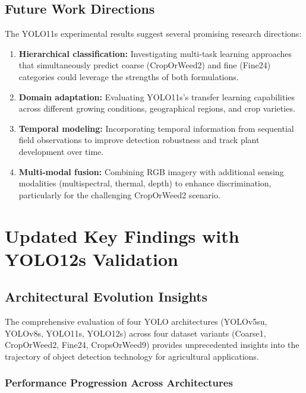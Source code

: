 \subsection{Future Work Directions}

The YOLO11s experimental results suggest several promising research directions:

\begin{enumerate}
    \item \textbf{Hierarchical classification:} Investigating multi-task learning approaches that simultaneously predict coarse (CropOrWeed2) and fine (Fine24) categories could leverage the strengths of both formulations.
    
    \item \textbf{Domain adaptation:} Evaluating YOLO11s's transfer learning capabilities across different growing conditions, geographical regions, and crop varieties.
    
    \item \textbf{Temporal modeling:} Incorporating temporal information from sequential field observations to improve detection robustness and track plant development over time.
    
    \item \textbf{Multi-modal fusion:} Combining RGB imagery with additional sensing modalities (multispectral, thermal, depth) to enhance discrimination, particularly for the challenging CropOrWeed2 scenario.
\end{enumerate}


\section{Updated Key Findings with YOLO12s Validation}

\subsection{Architectural Evolution Insights}

The comprehensive evaluation of four YOLO architectures (YOLOv5su, YOLOv8s, YOLO11s, YOLO12s) across four dataset variants (Coarse1, CropOrWeed2, Fine24, CropsOrWeed9) provides unprecedented insights into the trajectory of object detection technology for agricultural applications.

\subsubsection{Performance Progression Across Architectures}

